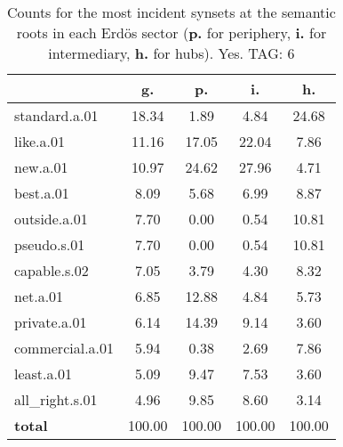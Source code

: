 \begin{table}[h!]
\begin{center}
\begin{tabular}{| l | c | c | c | c |}\hline
 & g. & p. & i. & h. \\\hline
standard.a.01 & 18.34  & 1.89  & 4.84  & 24.68 \\\hline
like.a.01 & 11.16  & 17.05  & 22.04  & 7.86 \\\hline
new.a.01 & 10.97  & 24.62  & 27.96  & 4.71 \\\hline
best.a.01 & 8.09  & 5.68  & 6.99  & 8.87 \\\hline
outside.a.01 & 7.70  & 0.00  & 0.54  & 10.81 \\\hline
pseudo.s.01 & 7.70  & 0.00  & 0.54  & 10.81 \\\hline
capable.s.02 & 7.05  & 3.79  & 4.30  & 8.32 \\\hline
net.a.01 & 6.85  & 12.88  & 4.84  & 5.73 \\\hline
private.a.01 & 6.14  & 14.39  & 9.14  & 3.60 \\\hline
commercial.a.01 & 5.94  & 0.38  & 2.69  & 7.86 \\\hline
least.a.01 & 5.09  & 9.47  & 7.53  & 3.60 \\\hline
all\_right.s.01 & 4.96  & 9.85  & 8.60  & 3.14 \\\hline
{{\bf total}} & 100.00  & 100.00  & 100.00  & 100.00 \\\hline
\end{tabular}
\caption{Counts for the most incident synsets at the semantic roots in each Erd\"os sector ({\bf p.} for periphery, {\bf i.} for intermediary, {\bf h.} for hubs). Yes. TAG: 6}
\end{center}
\end{table}